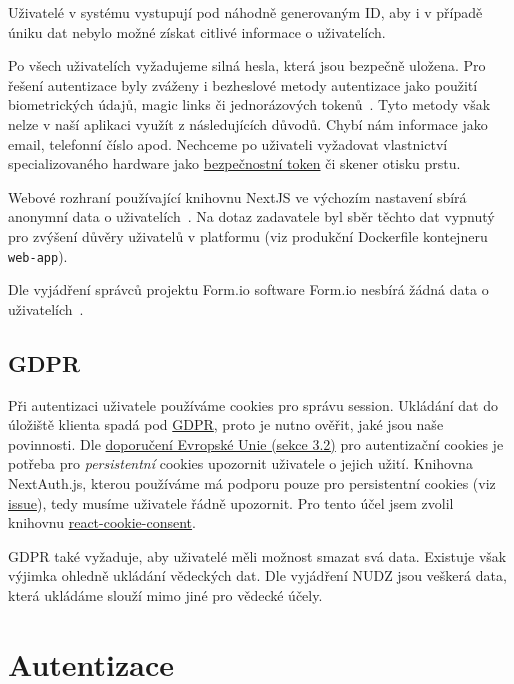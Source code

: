Uživatelé v systému vystupují pod náhodně generovaným ID, aby i v případě úniku dat nebylo možné získat citlivé informace o uživatelích.

Po všech uživatelích vyžadujeme silná hesla, která jsou bezpečně uložena.
Pro řešení autentizace byly zváženy i bezheslové metody autentizace jako použití biometrických údajů, magic links či jednorázových tokenů~\cite{what-is-passworless}.
Tyto metody však nelze v naší aplikaci využít z následujících důvodů.
Chybí nám informace jako email, telefonní číslo apod.
Nechceme po uživateli vyžadovat vlastnictví specializovaného hardware jako \href{https://cs.wikipedia.org/wiki/Bezpe%C4%8Dnostn%C3%AD_token}{bezpečnostní token} či skener otisku prstu.

Webové rozhraní používající knihovnu NextJS ve výchozím nastavení sbírá anonymní data o uživatelích~\cite{nextjs-telemetry}.
Na dotaz zadavatele byl sběr těchto dat vypnutý pro zvýšení důvěry uživatelů v platformu (viz produkční Dockerfile kontejneru \texttt{web-app}).

Dle vyjádření správců projektu Form.io software Form.io nesbírá žádná data o uživatelích~\cite{formio-telemetry-issue}.

\subsection{GDPR}\label{subsec:gdpr}

Při autentizaci uživatele používáme cookies pro správu session.
Ukládání dat do úložiště klienta spadá pod \href{https://eur-lex.europa.eu/eli/reg/2016/679/oj}{GDPR}, proto je nutno ověřit, jaké jsou naše povinnosti.
Dle \href{https://ec.europa.eu/justice/article-29/documentation/opinion-recommendation/files/2012/wp194_en.pdf}{doporučení Evropské Unie (sekce 3.2)} pro autentizační cookies je potřeba pro \emph{persistentní} cookies upozornit uživatele o jejich užití.
Knihovna NextAuth.js, kterou používáme má podporu pouze pro persistentní cookies (viz \href{https://github.com/nextauthjs/next-auth/issues/2534}{issue}), tedy musíme uživatele řádně upozornit.
Pro tento účel jsem zvolil knihovnu \href{https://www.npmjs.com/package/react-cookie-consent}{react-cookie-consent}.

GDPR také vyžaduje, aby uživatelé měli možnost smazat svá data.
Existuje však výjimka ohledně ukládání vědeckých dat.
Dle vyjádření NUDZ jsou veškerá data, která ukládáme slouží mimo jiné pro vědecké účely.


\section{Autentizace}\label{sec:auth}

